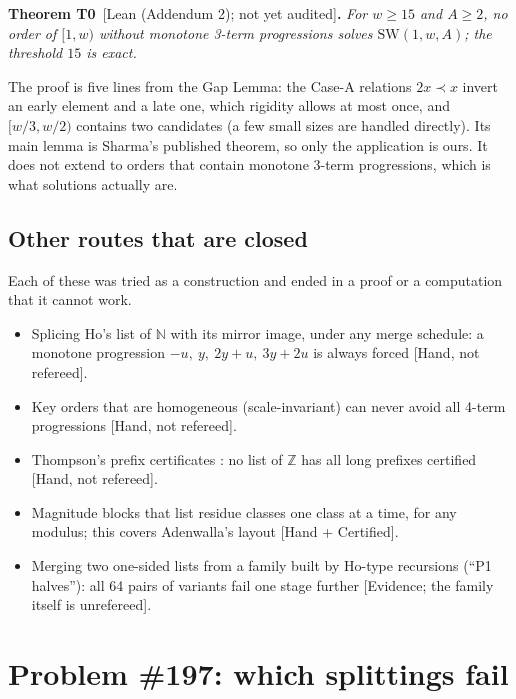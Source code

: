 \documentclass[11pt,letterpaper]{article}
\newcommand{\Z}{\mathbb{Z}}
\newcommand{\N}{\mathbb{N}}
\newcommand{\bef}{\prec}
\newcommand{\SW}{\mathrm{SW}}
\newcommand{\st}[1]{\textnormal{\textsf{\small[#1]}}}
\newenvironment{result}[2]%
  {\par\medskip\noindent\textbf{#1}\ \st{#2}\textbf{.}\enspace\itshape}%
  {\par\medskip}
\begin{document}
\begin{result}{Theorem T0}{Lean (Addendum 2); not yet audited}
For $w \ge 15$ and $A \ge 2$, no order of $[1,w)$ \emph{without monotone 3-term progressions} solves
$\SW(1,w,A)$; the threshold $15$ is exact.
\end{result}

The proof is five lines from the Gap Lemma: the Case-A relations $2x \bef x$ invert an early element and a
late one, which rigidity allows at most once, and $[w/3, w/2)$ contains two candidates (a few small sizes
are handled directly). Its main lemma is Sharma's published theorem, so only the application is ours. It
does not extend to orders that contain monotone 3-term progressions, which is what solutions actually are.

\subsection{Other routes that are closed}

Each of these was tried as a construction and ended in a proof or a computation that it cannot work.
\begin{itemize}
\item Splicing Ho's list of $\N$ with its mirror image, under any merge schedule: a monotone progression
$-u,\ y,\ 2y+u,\ 3y+2u$ is always forced \st{Hand, not refereed}.
\item Key orders that are homogeneous (scale-invariant) can never avoid all 4-term progressions
\st{Hand, not refereed}.
\item Thompson's prefix certificates \cite{Thompson}: no list of $\Z$ has all long prefixes certified
\st{Hand, not refereed}.
\item Magnitude blocks that list residue classes one class at a time, for any modulus; this covers
Adenwalla's layout \st{Hand + Certified}.
\item Merging two one-sided lists from a family built by Ho-type recursions (``P1 halves''): all 64 pairs of
variants fail one stage further \st{Evidence; the family itself is unrefereed}.
\end{itemize}

\section{Problem \#197: which splittings fail}\label{sec:197}
\end{document}

